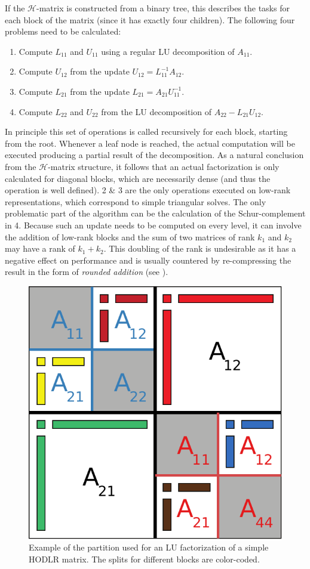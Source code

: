 \noindent If the $\mathcal{H}$-matrix is constructed from a binary tree, this describes the tasks for each block of the matrix (since it has exactly four children). The following four problems need to be calculated:
\begin{enumerate}
    \item Compute $L_{11}$ and $U_{11}$ using a regular LU decomposition of $A_{11}$.
    \item Compute $U_{12}$ from the update $U_{12} =L_{11}^{-1}A_{12}$.
    \item Compute $L_{21}$ from the update $L_{21} =A_{21}U_{11}^{-1}$.
    \item Compute $L_{22}$ and $U_{22}$ from the LU decomposition of $A_{22}-L_{21}U_{12}$.
\end{enumerate}

\noindent In principle this set of operations is called recursively for each block, starting from the root. Whenever a leaf node is reached, the actual computation will be executed producing a partial result of the decomposition. As a natural conclusion from the $\mathcal{H}$-matrix structure, it follows that an actual factorization is only calculated for diagonal blocks, which are necessarily dense (and thus the  operation is well defined). 2 \& 3 are the only operations executed on low-rank representations, which correspond to simple triangular solves. The only problematic part of the algorithm can be the calculation of the Schur-complement in 4. Because such an update needs to be computed on every level, it can involve the addition of low-rank blocks and the sum of two matrices of rank $k_1$ and $k_2$ may have a rank of $k_1+k_2$. This doubling of the rank is undesirable as it has a negative effect on performance and is usually countered by re-compressing the result in the form of \textit{rounded addition} (see \cite{bebendorf_hierarchical_2008}).

\begin{figure}[h]
    \centering
    \includegraphics[width=0.6\linewidth]{chapters/4_hierarchical_matrices/figures/hlu.pdf}
    \caption[\texorpdfstring{$\mathcal{H}$}{H}-matrix LU]{Example of the partition used for an LU factorization of a simple HODLR matrix. The splits for different blocks are color-coded.}
    \label{fig:hlu}
\end{figure}

